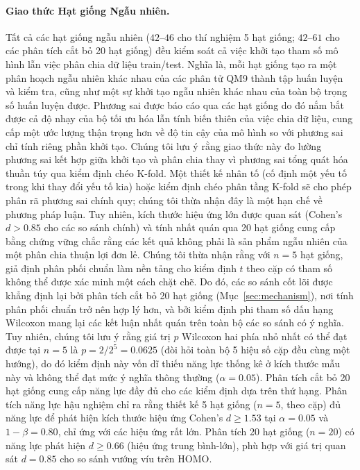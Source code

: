 \documentclass[10pt,twocolumn,letterpaper]{article}
\begin{document}
\paragraph{Giao thức Hạt giống Ngẫu nhiên.}
Tất cả các hạt giống ngẫu nhiên ($42$--$46$ cho thí nghiệm 5 hạt giống; $42$--$61$ cho các phân tích cắt bỏ 20 hạt giống) đều kiểm soát cả việc khởi tạo tham số mô hình lẫn việc phân chia dữ liệu train/test. Nghĩa là, mỗi hạt giống tạo ra một phân hoạch ngẫu nhiên khác nhau của các phân tử QM9 thành tập huấn luyện và kiểm tra, cũng như một sự khởi tạo ngẫu nhiên khác nhau của toàn bộ trọng số huấn luyện được. Phương sai được báo cáo qua các hạt giống do đó nắm bắt được cả độ nhạy của bộ tối ưu hóa lẫn tính biến thiên của việc chia dữ liệu, cung cấp một ước lượng thận trọng hơn về độ tin cậy của mô hình so với phương sai chỉ tính riêng phần khởi tạo. Chúng tôi lưu ý rằng giao thức này đo lường phương sai kết hợp giữa khởi tạo và phân chia thay vì phương sai tổng quát hóa thuần túy qua kiểm định chéo K-fold. Một thiết kế nhân tố (cố định một yếu tố trong khi thay đổi yếu tố kia) hoặc kiểm định chéo phân tầng K-fold sẽ cho phép phân rã phương sai chính quy; chúng tôi thừa nhận đây là một hạn chế về phương pháp luận. Tuy nhiên, kích thước hiệu ứng lớn được quan sát (Cohen's $d > 0.85$ cho các so sánh chính) và tính nhất quán qua 20 hạt giống cung cấp bằng chứng vững chắc rằng các kết quả không phải là sản phẩm ngẫu nhiên của một phân chia thuận lợi đơn lẻ.
Chúng tôi thừa nhận rằng với $n = 5$ hạt giống, giả định phân phối chuẩn làm nền tảng cho kiểm định $t$ theo cặp có tham số không thể được xác minh một cách chặt chẽ. Do đó, các so sánh cốt lõi được khẳng định lại bởi phân tích cắt bỏ 20 hạt giống (Mục~\ref{sec:mechanism}), nơi tính phân phối chuẩn trở nên hợp lý hơn, và bởi kiểm định phi tham số dấu hạng Wilcoxon mang lại các kết luận nhất quán trên toàn bộ các so sánh có ý nghĩa.
Tuy nhiên, chúng tôi lưu ý rằng giá trị $p$ Wilcoxon hai phía nhỏ nhất có thể đạt được tại $n = 5$ là $p = 2/2^5 = 0.0625$ (đòi hỏi toàn bộ 5 hiệu số cặp đều cùng một hướng), do đó kiểm định này vốn dĩ thiếu năng lực thống kê ở kích thước mẫu này và không thể đạt mức ý nghĩa thông thường ($\alpha = 0.05$). Phân tích cắt bỏ 20 hạt giống cung cấp năng lực đầy đủ cho các kiểm định dựa trên thứ hạng.
Phân tích năng lực hậu nghiệm chỉ ra rằng thiết kế 5 hạt giống ($n = 5$, theo cặp) đủ năng lực để phát hiện kích thước hiệu ứng Cohen's $d \ge 1.53$ tại $\alpha = 0.05$ và $1-\beta = 0.80$, chỉ ứng với các hiệu ứng rất lớn. Phân tích 20 hạt giống ($n = 20$) có năng lực phát hiện $d \ge 0.66$ (hiệu ứng trung bình-lớn), phù hợp với giá trị quan sát $d = 0.85$ cho so sánh vướng víu trên HOMO.
\end{document}
